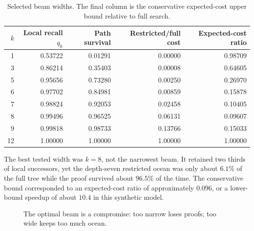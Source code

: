 \documentclass[11pt]{article}
\begin{document}
\begin{table}[ht]
\centering
\caption{Selected beam widths. The final column is the conservative expected-cost upper bound relative to full search.}
\begin{tabular}{rrrrr}
\toprule
\(k\) & Local recall \(q_k\) & Path survival & Restricted/full cost & Expected-cost ratio\\
\midrule
1 & 0.53722 & 0.01291 & 0.00000 & 0.98709\\
3 & 0.86214 & 0.35403 & 0.00008 & 0.64605\\
5 & 0.95656 & 0.73280 & 0.00250 & 0.26970\\
6 & 0.97702 & 0.84981 & 0.00859 & 0.15878\\
7 & 0.98824 & 0.92053 & 0.02458 & 0.10405\\
8 & 0.99496 & 0.96525 & 0.06131 & 0.09607\\
9 & 0.99818 & 0.98733 & 0.13766 & 0.15033\\
12& 1.00000 & 1.00000 & 1.00000 & 1.00000\\
\bottomrule
\end{tabular}
\end{table}

The best tested width was \(k=8\), not the narrowest beam. It retained two thirds of local successors, yet the depth-seven restricted ocean was only about \(6.1\%\) of the full tree while the proof survived about \(96.5\%\) of the time. The conservative bound corresponded to an expected-cost ratio of approximately \(0.096\), or a lower-bound speedup of about \(10.4\) in this synthetic model.

\begin{figure}[ht]
\centering
{}
\caption{The optimal beam is a compromise: too narrow loses proofs; too wide keeps too much ocean.}
\end{figure}
\end{document}
